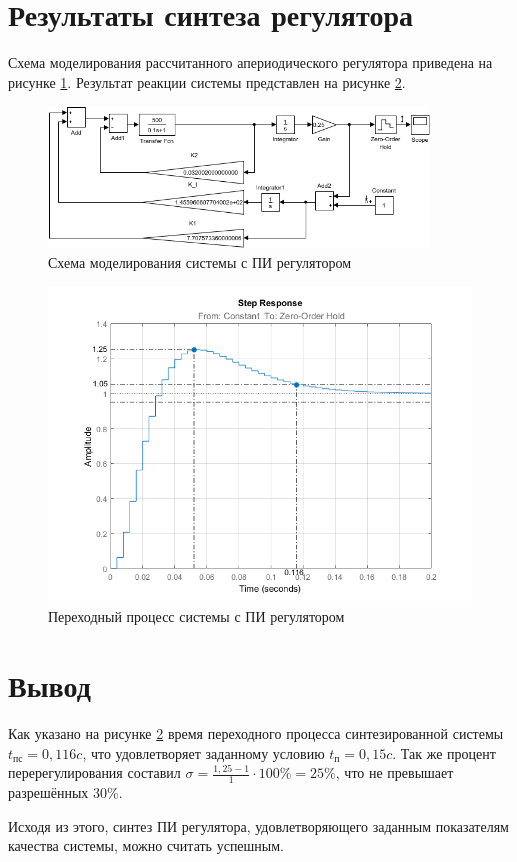 \documentclass[fleqn, a4paper, 11pt, russian]{article}
\begin{document}
	\section{Результаты синтеза регулятора}
	Схема моделирования рассчитанного апериодического регулятора приведена на рисунке \ref{finModel}. Результат реакции системы представлен на рисунке \ref{fin}.
	\begin{figure}[ht!]
		\centering
		\includegraphics[width = 0.9\textwidth]{finModel}
		\caption{Схема моделирования системы с  ПИ регулятором}
		\label{finModel}
	\end{figure}
	
	\begin{figure}[ht!]
		\centering
		\includegraphics[scale=0.8]{fin}
		\caption{Переходный процесс системы с ПИ регулятором}
		\label{fin}
	\end{figure}
	\clearpage
	\section*{Вывод}
	Как указано на рисунке \ref{fin} время переходного процесса синтезированной системы $t_\text{пс} = 0,116c$, что удовлетворяет заданному условию $t_\text{п} = 0,15c$. Так же процент перерегулирования составил $\sigma = \displaystyle{\frac{1,25 - 1}{1}}\cdot100\% = 25\%$, что не превышает разрешённых 30\%. 
	
	Исходя из этого, синтез ПИ регулятора, удовлетворяющего заданным показателям качества системы, можно считать успешным.
	
\end{document}
